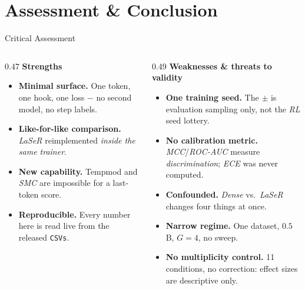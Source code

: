 \documentclass[aspectratio=169,10pt,t]{beamer}
\DeclareRobustCommand{\acit}[1]{\textit{\acs{#1}}}
\newcommand{\lead}[1]{{\color{jkunavy}\textbf{#1}}\par\vspace{1pt}}
\newcommand{\hl}[1]{\textcolor{jkumagenta}{\textbf{#1}}}
\newcommand{\nv}[1]{\textcolor{jkunavy}{\textbf{#1}}}
\begin{document}
\section{Assessment \& Conclusion}

\begin{frame}{Critical Assessment}
	\begin{columns}[T, onlytextwidth]
		\begin{column}{0.47\textwidth}
			\lead{\textcolor{jkunavy}{Strengths}}
			\begin{itemize}
				\setlength{\itemsep}{2pt}
				\item \nv{Minimal surface.} One token, one hook, one loss $-$ no second model, no step labels.
				\item \nv{Like-for-like comparison.} \acit{LaSeR} reimplemented \emph{inside the same trainer}.
				\item \nv{New capability.} Tempmod and \acit{SMC} are impossible for a last-token score.
				\item \nv{Reproducible.} Every number here is read live from the released \texttt{CSVs}.
			\end{itemize}
		\end{column}
		\begin{column}{0.49\textwidth}
			\lead{\textcolor{jkumagenta}{Weaknesses \& threats to validity}}
			\begin{itemize}
				\setlength{\itemsep}{2pt}
				\item \hl{One training seed.} The $\pm$ is evaluation sampling only, not the \acit{RL} seed lottery.
				\item \hl{No calibration metric.} \acit{MCC}/\acit{ROC-AUC} measure \emph{discrimination}; \acit{ECE} was never computed.
				\item \hl{Confounded.} \textit{Dense} vs.\ \acit{LaSeR} changes four things at once.
				\item \hl{Narrow regime.} One dataset, $0.5\,$B, $G=4$, no sweep.
				\item \hl{No multiplicity control.} 11 conditions, no correction: effect sizes are descriptive only.
			\end{itemize}
		\end{column}
	\end{columns}
\end{frame}
\end{document}
